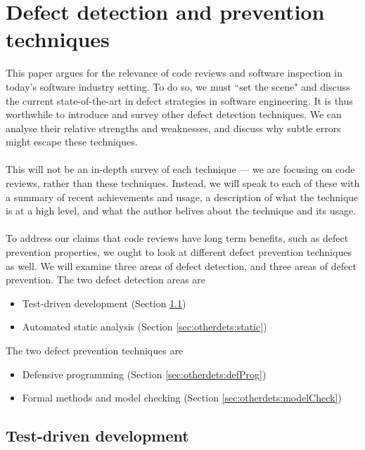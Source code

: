 \chapter{Defect detection and prevention techniques} \label{chap:otherdets}

This paper argues for the relevance of code reviews and software inspection in today's software
industry setting.
To do so, we must ``set the scene" and discuss the current state-of-the-art in defect strategies in
software engineering.
It is thus worthwhile to introduce and survey other defect detection techniques.
We can analyse their relative strengths and weaknesses, and discuss why subtle
errors might escape these techniques.\\
\\
This will not be an in-depth survey of each technique --- we are focusing on code reviews, rather
than these techniques.
Instead, we will speak to each of these with a summary of recent achievements and usage, a
description of what the technique is at a high level, and what the author belives about the
technique and its usage.\\
\\
To address our claims that code reviews have long term benefits, such as defect
prevention properties, we ought to look at different defect prevention
techniques as well.
We will examine three areas of defect detection, and three areas of defect
prevention.
The two defect detection areas are
\begin{itemize}
	\item Test-driven development (Section \ref{sec:otherdets:TDD})
	\item Automated static analysis (Section \ref{sec:otherdets:static})
\end{itemize}
The two defect prevention techniques are
\begin{itemize}
	\item Defensive programming (Section \ref{sec:otherdets:defProg})
	\item Formal methods and model checking (Section \ref{sec:otherdets:modelCheck})
\end{itemize}

\section{Test-driven development} \label{sec:otherdets:TDD}

